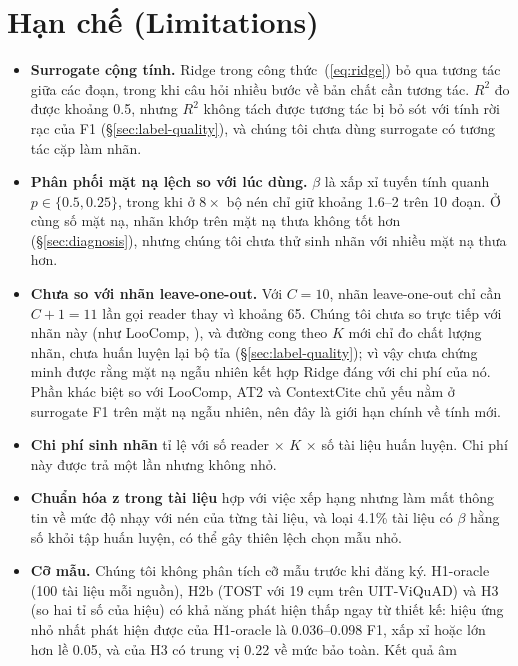 \documentclass[11pt]{article}
\begin{document}
\section*{Hạn chế (Limitations)}
\label{sec:limits}

\begin{itemize}
  \item \textbf{Surrogate cộng tính.} Ridge trong công thức~(\ref{eq:ridge}) bỏ qua tương tác giữa các đoạn,
  trong khi câu hỏi nhiều bước về bản chất cần tương tác. $R^2$ đo được khoảng 0.5, nhưng $R^2$ không tách được tương
  tác bị bỏ sót với tính rời rạc của F1 (\S\ref{sec:label-quality}), và chúng tôi chưa dùng surrogate có tương tác cặp
  làm nhãn.
  \item \textbf{Phân phối mặt nạ lệch so với lúc dùng.} $\beta$ là xấp xỉ tuyến tính quanh $p\in\{0.5, 0.25\}$, trong khi ở
  $8\times$ bộ nén chỉ giữ khoảng 1.6--2 trên 10 đoạn. Ở cùng số mặt nạ, nhãn khớp trên mặt nạ thưa không tốt hơn
  (\S\ref{sec:diagnosis}), nhưng chúng tôi chưa thử sinh nhãn với nhiều mặt nạ thưa hơn.
  \item \textbf{Chưa so với nhãn leave-one-out.} Với $C=10$, nhãn leave-one-out chỉ cần $C{+}1=11$ lần gọi reader thay vì
  khoảng 65. Chúng tôi chưa so trực tiếp với nhãn này (như LooComp, \citealp{looComp2026}), và đường cong theo $K$ mới chỉ đo chất
  lượng nhãn, chưa huấn luyện lại bộ tỉa (\S\ref{sec:label-quality}); vì vậy chưa chứng minh được rằng mặt nạ ngẫu nhiên kết hợp Ridge đáng với chi phí của nó. Phần khác
  biệt so với LooComp, AT2 và ContextCite chủ yếu nằm ở surrogate F1 trên mặt nạ ngẫu nhiên, nên đây là giới hạn chính
  về tính mới.
  \item \textbf{Chi phí sinh nhãn} tỉ lệ với số reader $\times$ $K$ $\times$ số tài
  liệu huấn luyện. Chi phí này được trả một lần nhưng không nhỏ.
  \item \textbf{Chuẩn hóa z trong tài liệu} hợp với việc xếp hạng nhưng làm mất thông tin về mức độ nhạy với nén của
  từng tài liệu, và loại 4.1\% tài liệu có $\beta$ hằng số khỏi tập huấn luyện, có thể gây thiên lệch chọn mẫu nhỏ.
  \item \textbf{Cỡ mẫu.} Chúng tôi không phân tích cỡ mẫu trước khi đăng ký. H1-oracle (100 tài liệu mỗi nguồn), H2b
  (TOST với 19 cụm trên UIT-ViQuAD) và H3 (so hai tỉ số của hiệu) có khả năng phát hiện thấp ngay từ thiết kế: hiệu ứng nhỏ nhất phát hiện
  được của H1-oracle là 0.036--0.098 F1, xấp xỉ hoặc lớn hơn lề 0.05, và của H3 có trung vị 0.22 về mức bảo toàn. Kết quả âm

\end{itemize}
\end{document}
